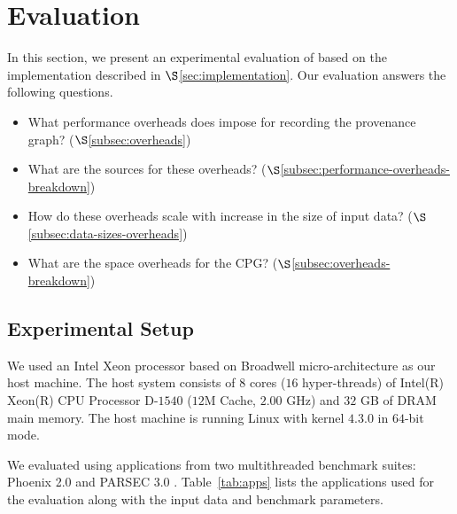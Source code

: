 
\section{Evaluation}
\label{sec:evaluation}
In this section, we present an experimental evaluation of \projecttitle based on the implementation described in  $\S$\ref{sec:implementation}. 
Our evaluation answers the following questions.



\begin{itemize}
\item What performance overheads does \projecttitle impose for recording the provenance graph? ($\S$\ref{subsec:overheads})
\item What are the sources for these overheads? ($\S$\ref{subsec:performance-overheads-breakdown})
\item How do these overheads scale with increase in the size of input data? ($\S$\ref{subsec:data-sizes-overheads})
\item What are the space overheads for the CPG? ($\S$\ref{subsec:overheads-breakdown})
\end{itemize}



\subsection{Experimental Setup}


 We used an Intel Xeon processor based on Broadwell micro-architecture
as our host machine. The
host system consists of $8$ cores ($16$ hyper-threads) of Intel(R) Xeon(R) CPU Processor D-$1540$
($12$M Cache, $2.00$ GHz) and $32$ GB of DRAM main memory. The host
machine is running Linux with kernel $4.3.0$ in $64$-bit mode. 



  We evaluated \projecttitle using applications from two multithreaded benchmark suites: Phoenix 2.0 \cite{phoenix} and PARSEC 3.0 \cite{parsec}. Table~\ref{tab:apps} lists the applications used for the evaluation along with the input data and benchmark parameters.
%


